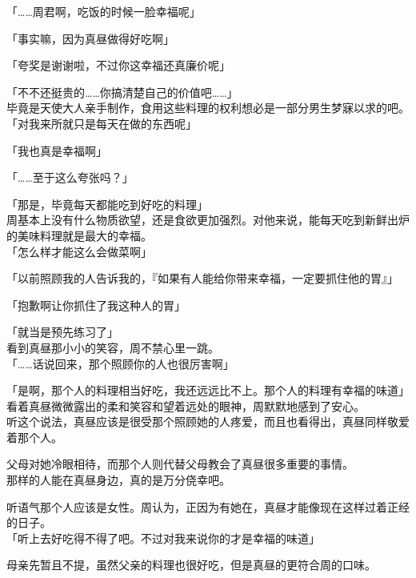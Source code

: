 「……周君啊，吃饭的时候一脸幸福呢」

「事实嘛，因为真昼做得好吃啊」

「夸奖是谢谢啦，不过你这幸福还真廉价呢」

「不不还挺贵的……你搞清楚自己的价值吧……」\\

毕竟是天使大人亲手制作，食用这些料理的权利想必是一部分男生梦寐以求的吧。\\

「对我来所就只是每天在做的东西呢」

「我也真是幸福啊」

「……至于这么夸张吗？」

「那是，毕竟每天都能吃到好吃的料理」\\

周基本上没有什么物质欲望，还是食欲更加强烈。对他来说，能每天吃到新鲜出炉的美味料理就是最大的幸福。\\

「怎么样才能这么会做菜啊」

「以前照顾我的人告诉我的，『如果有人能给你带来幸福，一定要抓住他的胃』」

「抱歉啊让你抓住了我这种人的胃」

「就当是预先练习了」\\

看到真昼那小小的笑容，周不禁心里一跳。\\

「……话说回来，那个照顾你的人也很厉害啊」

「是啊，那个人的料理相当好吃，我还远远比不上。那个人的料理有幸福的味道」\\

看着真昼微微露出的柔和笑容和望着远处的眼神，周默默地感到了安心。\\

听这个说法，真昼应该是很受那个照顾她的人疼爱，而且也看得出，真昼同样敬爱着那个人。

父母对她冷眼相待，而那个人则代替父母教会了真昼很多重要的事情。\\

那样的人能在真昼身边，真的是万分侥幸吧。

听语气那个人应该是女性。周认为，正因为有她在，真昼才能像现在这样过着正经的日子。\\

「听上去好吃得不得了吧。不过对我来说你的才是幸福的味道」

母亲先暂且不提，虽然父亲的料理也很好吃，但是真昼的更符合周的口味。\\

